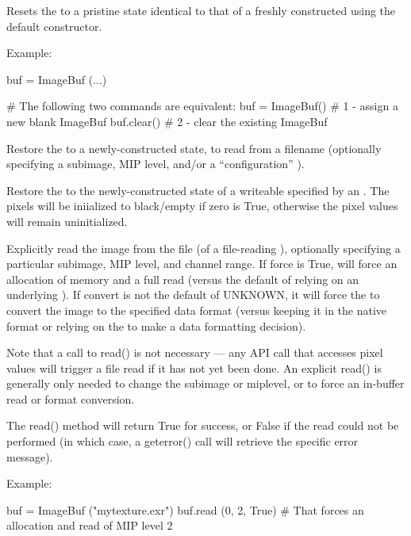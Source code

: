 Resets the \ImageBuf to a pristine state identical to that of a freshly
constructed \ImageBuf using the default constructor.

\noindent Example:
\begin{code}
    buf = ImageBuf (...)

    # The following two commands are equivalent:
    buf = ImageBuf()     # 1 - assign a new blank ImageBuf
    buf.clear()          # 2 - clear the existing ImageBuf
\end{code}
\apiend

Restore the \ImageBuf to a newly-constructed state, to read from
a filename (optionally specifying a subimage, MIP level, and/or 
a ``configuration'' \ImageSpec).
\apiend

Restore the \ImageBuf to the newly-constructed state of a writeable
\ImageBuf specified by an \ImageSpec.
The pixels will be iniialized to black/empty if {\cf zero} is True,
otherwise the pixel values will remain uninitialized.
\apiend

Explicitly read the image from the file (of a file-reading \ImageBuf), optionally
specifying a particular subimage, MIP level, and channel range.  If {\cf force} is {\cf True},
will force an allocation of memory and a full read (versus the default of
relying on an underlying \ImageCache).  If {\cf convert} is not
the default of {\cf UNKNOWN}, it will force the \ImageBuf to convert the
image to the specified data format (versus keeping it in the native 
format or relying on the \ImageCache to make a data formatting decision).

Note that a call to {\cf read()} is not necessary --- any \ImageBuf API call
that accesses pixel values will trigger a file read if it has not yet been
done. An explicit {\cf read()} is generally only needed to change the
subimage or miplevel, or to force an in-buffer read or format conversion.

The {\cf read()} method will return {\cf True} for success, or {\cf False}
if the read could not be performed (in which case, a {\cf geterror()} call
will retrieve the specific error message).

\noindent Example:
\begin{code}
    buf = ImageBuf ("mytexture.exr")
    buf.read (0, 2, True)
    # That forces an allocation and read of MIP level 2
\end{code}
\apiend

